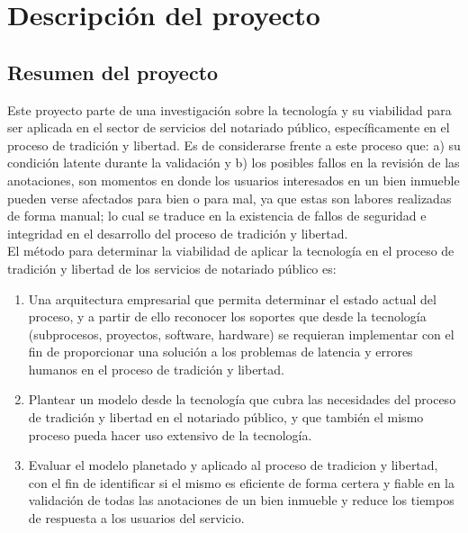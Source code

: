 
\chapter{Descripción del proyecto} %

\label{Chapter1} %


\section{Resumen del proyecto}
Este proyecto parte de una investigación sobre la tecnología \blckchn y su viabilidad para ser aplicada en el sector de servicios del notariado público, específicamente en el proceso de tradición y libertad. Es de considerarse frente a este proceso que: a) su condición latente durante la validación y b) los posibles fallos en la revisión de las anotaciones, son momentos en donde los usuarios interesados en un bien inmueble pueden verse afectados para bien o para mal, ya que estas son labores realizadas de forma manual; lo cual se traduce en la existencia de fallos de seguridad e integridad en el desarrollo del proceso de tradición y libertad.
\\
El método para determinar la viabilidad de aplicar la tecnología \blckchn en el proceso de tradición y libertad de los servicios de notariado público es:   

\begin{enumerate}
\item Una arquitectura empresarial que permita determinar el estado actual del proceso, y a partir de ello reconocer los soportes que desde la tecnología \blckchn (subprocesos, proyectos, software, hardware) se requieran implementar con el fin de proporcionar una solución a los problemas de latencia y errores humanos en el proceso de tradición y libertad. 
\item Plantear un modelo desde la tecnología \blckchn que cubra las necesidades del proceso de tradición y libertad en el notariado público, y que también el mismo proceso pueda hacer uso extensivo de la tecnología. 
\item Evaluar el modelo \blckchn planetado y aplicado al proceso de tradicion y libertad, con el fin de identificar si el mismo es eficiente de forma certera y fiable en la validación de todas las anotaciones de un bien inmueble y reduce los tiempos de respuesta a los usuarios del servicio.
\end{enumerate}

